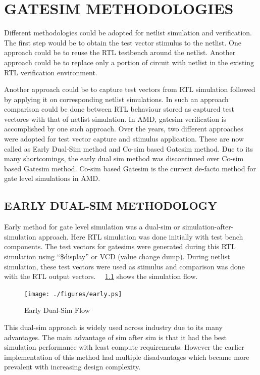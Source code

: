 \chapter{GATESIM METHODOLOGIES}
\label{chap:methodologies.tex}

Different methodologies could be adopted for netlist simulation and verification. The first step would be to obtain the test vector stimulus to the netlist. One approach could be to reuse the RTL testbench around the netlist. Another approach could be to replace only a portion of circuit with netlist in the existing RTL verification environment.

Another approach could be to capture test vectors from RTL simulation followed by applying it on corresponding netlist simulations. In such an approach comparison could be done between RTL behaviour stored as captured test vectores with that of netlist simulation.  In AMD, gatesim verification is accomplished by one such approach. Over the years, two different approaches were adopted for test vector capture and stimulus application. These are now called as Early Dual-Sim method and Co-sim based Gatesim method. Due to its many shortcomings, the early dual sim method was discontinued over Co-sim based Gatesim method. Co-sim based Gatesim is the current de-facto method for gate level simulations in AMD.


\section{EARLY DUAL-SIM METHODOLOGY}
Early method for gate level simulation was a dual-sim or simulation-after-simulation approach. Here RTL simulation was done initially with test bench components. The test vectors for gatesims were generated during this RTL simulation using ``\$display'' or VCD (value change dump). During netlist simulation, these test vectors were used as stimulus and comparison was done with the RTL output vectors. ~\figurename{~\ref{fig:early.ps}} shows the simulation flow. %

\begin{figure}[H]
\centering
\texttt{[image: ./figures/early.ps]}
\caption{Early Dual-Sim Flow}
\label{fig:early.ps}
\end{figure}

This dual-sim approach is widely used across industry due to its many advantages. The main advantage of sim after sim is that it had the best simulation performance with least compute requirements. However the earlier implementation of this method had multiple disadvantages which became more prevalent with increasing design complexity.


